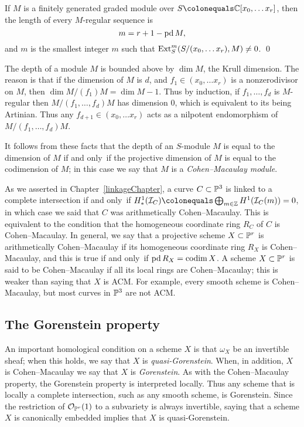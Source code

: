 \begin{theorem}\label{Auslander--Buchsbaum}
If $M$ is a finitely generated graded module
over $S \colonequals  \CC[x_0, \dots x_r]$,
then the length of every $M$-regular sequence is
$$m = r+1 - \pd M,$$
and $m$ is the smallest integer $m$ such that
$\Ext_S^m(S/(x_0, \dots x_r), M) \neq 0$.
%
\qed
\end{theorem}

The depth of a module $M$ is bounded above by $\dim M$, the Krull
dimension. The reason is that if the dimension of $M$
is $d$, and $f_1 \in (x_0, \dots x_r) $ is a nonzerodivisor on $M$,
then $\dim M/(f_1)M= \dim M-1$. Thus by induction, if
$f_1,\dots, f_d$ is $M$-regular then $M/(f_1, \dots, f_d)M$ has
dimension 0, which is equivalent to its being Artinian. Thus any
$ f_{d+1} \in(x_0, \dots x_r) $ acts as a nilpotent endomorphism of
$M/(f_1, \dots, f_d)M$.

It follows from these facts that the depth of an $S$-module $M$ is equal
to the dimension of $M$ if and only~if the projective dimension
of $M$ is equal to the codimension of $M$; in this case we say that $M$
is a
%
\emph{Cohen--Macaulay module}.

As we asserted in Chapter~\ref{linkageChapter}, a curve $C\subset \PP^3$
is linked to a complete intersection
if and only~if
$H^1_*(\sI_C) \colonequals  \bigoplus_{m\in \ZZ} H^1(\sI_C(m)) = 0$,
in which case we said that $C$ was
arithmetically Cohen--Macaulay.
%
This is equivalent to the condition that the homogeneous coordinate
ring $R_{C}$ of $C$ is Cohen--Macaulay.
In general, we say that a projective scheme $X\subset \PP^{r}$
is arithmetically Cohen--Macaulay if its homogeneous coordinate ring $R_{X}$
is Cohen--Macaulay, and this is true
if and only~if $\pd R_X = \codim X$. A scheme $X\subset \PP^{r}$ is said to be Cohen--Macaulay
if all its local rings are Cohen--Macaulay; this is weaker  than saying that $X$ is ACM.
%
For example, every smooth scheme is Cohen--Macaulay, but most curves in $\PP^{3}$
are not ACM.

\subsection*{The Gorenstein property}
An important homological condition on a scheme $X$ is 
that $\omega_X$ be
an invertible sheaf; when this holds, we say that $X$
is \emph{quasi-Gorenstein}. When, in addition, $X$ is Cohen--Macaulay
%
%
we say that $X$ is \emph{Gorenstein}. As with the Cohen--Macaulay property,
the Gorenstein property is interpreted locally.
Thus any scheme that is locally a
complete intersection, such as any smooth scheme, is Gorenstein. Since
the restriction
of $\sO_{\PP^r}(1)$ to a subvariety is always invertible, saying that
a scheme $X$ is canonically embedded implies that
$X$ is quasi-Gorenstein. 

